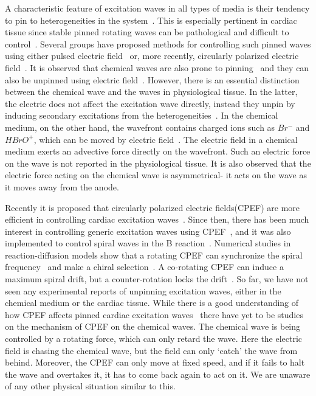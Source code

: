 \documentclass[%
 reprint,
 amsmath,amssymb,
 aps,
prb,
]{revtex4-2}
\begin{document}
A characteristic feature of excitation waves in all types of media is their
tendency to pin to heterogeneities in the
system~\cite{sutthiopad2015propagation, lim2006spiral,Zemlin2012, Shajahan:07}. This is especially
pertinent in cardiac tissue since stable pinned rotating waves can be
pathological and difficult to control~\cite{Gray2011, Bittihn2010}. Several
groups have proposed methods for controlling such pinned waves using either
pulsed electric field~\cite{Luther2011} or, more recently, circularly
polarized electric field~\cite{Feng2014, pan2016removal,feng2022removal}. It is
observed that chemical waves are also prone to pinning~\cite{???} and they can
also be unpinned using electric field~\cite{Amrutha,???}. However, there is an
essential distinction between the chemical wave and the waves in physiological
tissue. In the latter, the electric does not affect the excitation wave
directly, instead they unpin by inducing secondary excitations from the
heterogeneities~\cite{pumir2007wave}. In the chemical medium, on the other hand,
the wavefront
contains charged ions such as $Br^-$ and $HBrO^+$, which can be moved by
electric field~\cite{Amrutha,jimenez2013electric,???}. The electric field in a
chemical medium exerts an advective force directly on the wavefront. Such an electric force on the wave is not reported in the physiological tissue. It is
also observed that the electric force acting on the chemical wave is
asymmetrical- it acts on the wave as it moves away from the anode.   

Recently it is proposed that circularly polarized electric fields(CPEF) are
more efficient in controlling cardiac excitation
waves~\cite{feng2022removal,punacha2020theory,Feng2014}. Since then, there has
been much interest in controlling generic excitation waves using
CPEF~\cite{pan2016removal}, and it was also implemented to control spiral waves
in the B reaction~\cite{chen2009synchronization,ji2013experimental}. Numerical studies in reaction-diffusion models show that a rotating CPEF can synchronize the spiral frequency~\cite{chen2009synchronization} and make a chiral selection~\cite{li2013chiral}.
A co-rotating CPEF can induce a maximum spiral drift, but a counter-rotation
locks the drift~\cite{chen2006drift}. 
So far, we have not seen any experimental reports of unpinning excitation
waves, either in the chemical
medium or the cardiac tissue.  While there is a good understanding of how CPEF
affects pinned cardiac excitation waves~\cite{punacha2020theory} there have yet
to be studies on the
mechanism of CPEF on the chemical waves. The chemical wave is being controlled
by a rotating force, which can only retard the wave. Here the electric field is
chasing the chemical wave, but the field can only `catch' the wave from behind.
Moreover, the CPEF can only move at fixed
speed, and if it fails to halt the wave and overtakes it, it has to come back
again to act on it. We are unaware of any other physical situation 
similar to this.
\end{document}
